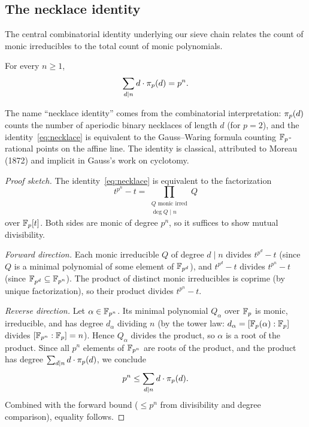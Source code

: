 \subsection{The necklace identity}

The central combinatorial identity underlying our sieve chain relates the
count of monic irreducibles to the total count of monic polynomials.

\begin{theorem}\label{thm:necklace}
For every $n \geq 1$,
\begin{equation}\label{eq:necklace}
  \sum_{d \mid n} d \cdot \pi_p(d) = p^n.
\end{equation}
\end{theorem}

The name ``necklace identity'' comes from the combinatorial interpretation:
$\pi_p(d)$ counts the number of aperiodic binary necklaces of length
$d$ (for $p = 2$), and the identity~\eqref{eq:necklace} is equivalent to
the Gauss--Waring formula counting $\mathbb{F}_p$-rational points on the affine line.
The identity is classical, attributed to Moreau (1872) and implicit in Gauss's
work on cyclotomy.

\begin{proof}[Proof sketch]
The identity~\eqref{eq:necklace} is equivalent to the factorization
\begin{equation}\label{eq:Xpn-factor}
  t^{p^n} - t = \prod_{\substack{Q \text{ monic irred} \\ \deg Q \mid n}} Q
\end{equation}
over $\mathbb{F}_p[t]$. Both sides are monic of degree $p^n$, so it suffices to show
mutual divisibility.

\emph{Forward direction.} Each monic irreducible $Q$ of degree $d \mid n$
divides $t^{p^d} - t$ (since $Q$ is a minimal polynomial of some element of
$\mathbb{F}_{p^{d}}$), and $t^{p^d} - t$ divides $t^{p^n} - t$ (since $\mathbb{F}_{p^{d}}
\subseteq \mathbb{F}_{p^{n}}$). The product of distinct monic irreducibles is coprime
(by unique factorization), so their product divides $t^{p^n} - t$.

\emph{Reverse direction.} Let $\alpha \in \mathbb{F}_{p^{n}}$. Its minimal polynomial
$Q_\alpha$ over $\mathbb{F}_p$ is monic, irreducible, and has degree $d_\alpha$
dividing $n$ (by the tower law:
$d_\alpha = [\mathbb{F}_p(\alpha) : \mathbb{F}_p]$ divides $[\mathbb{F}_{p^{n}} : \mathbb{F}_p] = n$).
Hence $Q_\alpha$ divides the product, so $\alpha$ is a root of the product.
Since all $p^n$ elements of $\mathbb{F}_{p^{n}}$ are roots of the product, and the
product has degree $\sum_{d \mid n} d \cdot \pi_p(d)$, we conclude
\[
  p^n \leq \sum_{d \mid n} d \cdot \pi_p(d).
\]
Combined with the forward bound ($\leq p^n$ from divisibility and degree
comparison), equality follows.
\end{proof}

